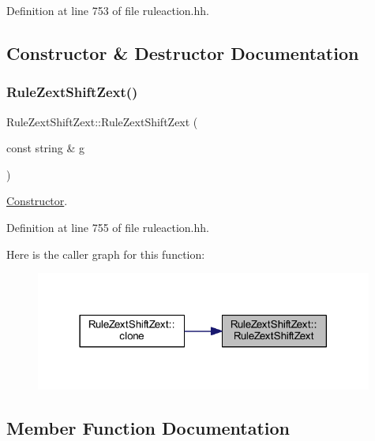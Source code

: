Definition at line 753 of file ruleaction.\+hh.



\subsection{Constructor \& Destructor Documentation}
\mbox{\label{class_rule_zext_shift_zext_aa5c60af258da82264e37438a107c9842}} 
\subsubsection{\texorpdfstring{RuleZextShiftZext()}{RuleZextShiftZext()}}
{\footnotesize\ttfamily Rule\+Zext\+Shift\+Zext\+::\+Rule\+Zext\+Shift\+Zext (\begin{DoxyParamCaption}\item[{const string \&}]{g }\end{DoxyParamCaption})\hspace{0.3cm}{\ttfamily [inline]}}



\mbox{\hyperlink{class_constructor}{Constructor}}. 



Definition at line 755 of file ruleaction.\+hh.

Here is the caller graph for this function\+:
\nopagebreak
\begin{figure}[H]
\begin{center}
\leavevmode
\includegraphics[width=314pt]{class_rule_zext_shift_zext_aa5c60af258da82264e37438a107c9842_icgraph}
\end{center}
\end{figure}


\subsection{Member Function Documentation}
\mbox{\label{class_rule_zext_shift_zext_af3714cc3a4c7d45605a720c076802f98}} 
